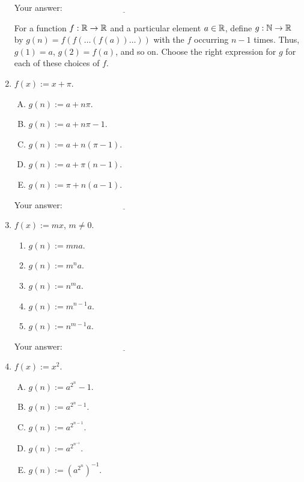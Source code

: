 \documentclass[10pt]{amsart}
\begin{document}
\begin{enumerate}
  \vspace{0.1in}
  Your answer: $\underline{\qquad\qquad\qquad\qquad\qquad\qquad\qquad}$
  \vspace{0.15in}

  For a function $f: \mathbb{R} \to \mathbb{R}$ and a particular element $a \in \mathbb{R}$,
  define $g: \mathbb{N} \to \mathbb{R}$ by $g(n) = f(f(\dots(f(a))\dots))$ with the
  $f$ occurring $n - 1$ times. Thus, $g(1) = a$, $g(2) = f(a)$, and so
  on. Choose the right expression for $g$ for each of these choices of $f$.

\item $f(x) := x + \pi$.
  \begin{enumerate}[(A)]
  \item $g(n) := a + n\pi$.
  \item $g(n) := a + n\pi - 1$.
  \item $g(n) := a + n(\pi - 1)$.
  \item $g(n) := a + \pi(n - 1)$.
  \item $g(n) := \pi + n(a - 1)$.
  \end{enumerate}

  \vspace{0.1in}
  Your answer: $\underline{\qquad\qquad\qquad\qquad\qquad\qquad\qquad}$
  \vspace{0.15in}

\item $f(x) := mx$, $m \ne 0$.
  \begin{enumerate}
  \item $g(n) := mna$.
  \item $g(n) := m^na$.
  \item $g(n) := n^ma$.
  \item $g(n) := m^{n-1}a$.
  \item $g(n) := n^{m-1}a$.
  \end{enumerate}

  \vspace{0.1in}
  Your answer: $\underline{\qquad\qquad\qquad\qquad\qquad\qquad\qquad}$
  \vspace{0.15in}

\item $f(x) := x^2$.
  \begin{enumerate}[(A)]
  \item $g(n) := a^{2^n} - 1$.
  \item $g(n) := a^{2^n - 1}$.
  \item $g(n) := a^{2^{n-1}}$.
  \item $g(n) := a^{2^{n^{-1}}}$.
  \item $g(n) := (a^{2^n})^{-1}$.
  \end{enumerate}


\end{enumerate}
\end{document}
